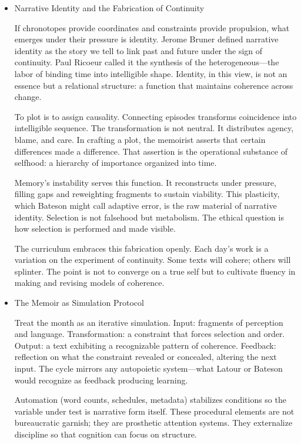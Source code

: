 \documentclass[11pt]{article}
\begin{document}
\begin{itemize}
Across thirty days, constraints accumulate as training. They teach the hand to select, the ear to hear pattern, and judgment to distinguish necessity from ornament. The paradox: discipline expands possibility.
\item Narrative Identity and the Fabrication of Continuity
\label{sec:orgb75b45a}

If chronotopes provide coordinates and constraints provide propulsion, what emerges under their pressure is identity. Jerome Bruner defined narrative identity as the story we tell to link past and future under the sign of continuity. Paul Ricoeur called it the synthesis of the heterogeneous—the labor of binding time into intelligible shape. Identity, in this view, is not an essence but a relational structure: a function that maintains coherence across change.

To plot is to assign causality. Connecting episodes transforms coincidence into intelligible sequence. The transformation is not neutral. It distributes agency, blame, and care. In crafting a plot, the memoirist asserts that certain differences made a difference. That assertion is the operational substance of selfhood: a hierarchy of importance organized into time.

Memory’s instability serves this function. It reconstructs under pressure, filling gaps and reweighting fragments to sustain viability. This plasticity, which Bateson might call adaptive error, is the raw material of narrative identity. Selection is not falsehood but metabolism. The ethical question is how selection is performed and made visible.

The curriculum embraces this fabrication openly. Each day’s work is a variation on the experiment of continuity. Some texts will cohere; others will splinter. The point is not to converge on a true self but to cultivate fluency in making and revising models of coherence.
\item The Memoir as Simulation Protocol
\label{sec:org5db5bf5}

Treat the month as an iterative simulation. Input: fragments of perception and language. Transformation: a constraint that forces selection and order. Output: a text exhibiting a recognizable pattern of coherence. Feedback: reflection on what the constraint revealed or concealed, altering the next input. The cycle mirrors any autopoietic system—what Latour or Bateson would recognize as feedback producing learning.

Automation (word counts, schedules, metadata) stabilizes conditions so the variable under test is narrative form itself. These procedural elements are not bureaucratic garnish; they are prosthetic attention systems. They externalize discipline so that cognition can focus on structure.


\end{itemize}
\end{document}
